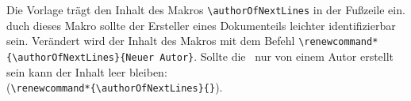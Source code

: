 \renewcommand*{\authorOfNextLines}{Helmut Quinz}
Die Vorlage trägt den Inhalt des Makros \verb|\authorOfNextLines| in der Fußzeile ein.
duch dieses Makro sollte der Ersteller eines Dokumenteils leichter identifizierbar sein.
Verändert wird der Inhalt des Makros mit dem Befehl \verb|\renewcommand*{\authorOfNextLines}{Neuer Autor}|.
Sollte die \typeOfWork ~nur von einem Autor erstellt sein kann der Inhalt leer bleiben:\\
(\verb|\renewcommand*{\authorOfNextLines}{}|).